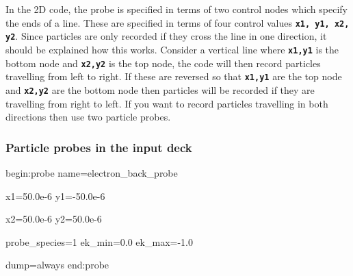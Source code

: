 \documentclass[12pt,a4paper]{article}
\newcommand{\inlinecode}[1]{{\color{warwickred} \bf\texttt{#1}}}
\newenvironment{boxverbatim}{\lboxverbatim{none}}{\endlboxverbatim}
\begin{document}
In the 2D code, the probe is specified in terms of two control nodes which
specify the ends of a line. These are specified in terms of four control
values \inlinecode{x1, y1, x2, y2}. Since particles are only recorded if they
cross the line in one direction, it should be explained how this
works. Consider a vertical line where \inlinecode{x1,y1} is the bottom node
and \inlinecode{x2,y2} is the top node, the code will then record particles
travelling from left to right. If these are reversed so that
\inlinecode{x1,y1} are the top node and \inlinecode{x2,y2} are the bottom node
then particles will be recorded if they are travelling from right to left. If
you want to record particles travelling in both directions then use two
particle probes.

\subsubsection{Particle probes in the input deck}
\begin{boxverbatim}
begin:probe
   name=electron_back_probe

   x1=50.0e-6
   y1=-50.0e-6

   x2=50.0e-6
   y2=50.0e-6

   probe_species=1
   ek_min=0.0
   ek_max=-1.0

   dump=always
end:probe
\end{boxverbatim}
\end{document}
